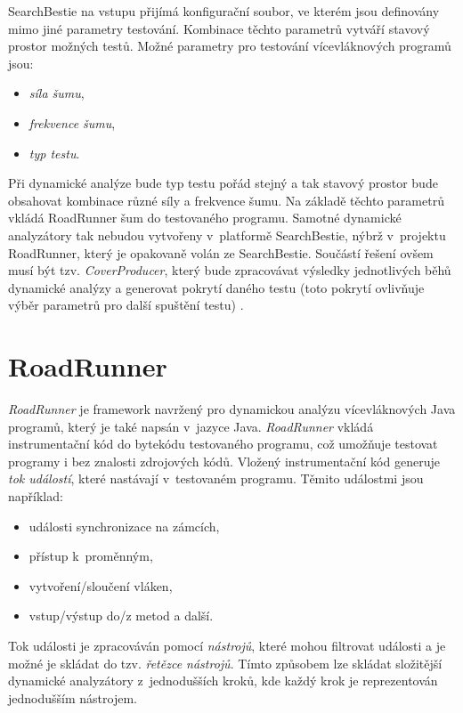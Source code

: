 SearchBestie na vstupu přijímá konfigurační soubor, ve kterém jsou definovány mimo jiné parametry testování. Kombinace těchto parametrů vytváří stavový prostor možných testů. Možné parametry pro testování vícevláknových programů jsou:
\begin{itemize}
\item \textit{síla šumu},
\item \textit{frekvence šumu},
\item \textit{typ testu}.
\end{itemize}

Při dynamické analýze bude typ testu pořád stejný a tak stavový prostor bude obsahovat kombinace různé síly a frekvence šumu. Na základě těchto parametrů vkládá RoadRunner šum do testovaného programu. Samotné dynamické analyzátory tak nebudou vytvořeny v~platformě SearchBestie, nýbrž v~projektu RoadRunner, který je opakovaně volán ze SearchBestie. Součástí řešení ovšem musí být tzv. \textit{CoverProducer}, který bude zpracovávat výsledky jednotlivých běhů dynamické analýzy a generovat pokrytí daného testu (toto pokrytí ovlivňuje výběr parametrů pro další spuštění testu) \cite{cite:sb,cite:rr}.

\section{RoadRunner}\label{roadrunner}
\textit{RoadRunner} \cite{cite:rr} je framework navržený pro dynamickou analýzu vícevláknových Java programů, který je také napsán v~jazyce Java.
\textit{RoadRunner} vkládá instrumentační kód do bytekódu testovaného programu, což umožňuje testovat programy i bez znalosti zdrojových kódů. Vložený instrumentační kód generuje \textit{tok událostí}, které nastávají v~testovaném programu. Těmito událostmi jsou například:
\begin{itemize}
\item události synchronizace na zámcích,
\item přístup k~proměnným,
\item vytvoření/sloučení vláken,
\item vstup/výstup do/z metod a další.
\end{itemize}

Tok události je zpracováván pomocí \textit{nástrojů}, které mohou filtrovat události a je možné je skládat do tzv. \textit{řetězce nástrojů}. Tímto způsobem lze skládat složitější dynamické analyzátory z~jednodušších kroků, kde každý krok je reprezentován jednodušším nástrojem.

